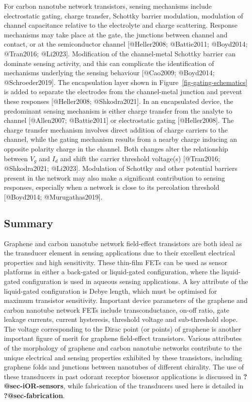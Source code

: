 \documentclass[
  letterpaper,
  DIV=11,
  numbers=noendperiod]{scrartcl}
\begin{document}
For carbon nanotube network transistors, sensing mechanisms include
electrostatic gating, charge transfer, Schottky barrier modulation,
modulation of channel capacitance relative to the electrolyte and charge
scattering. Response mechanisms may take place at the gate, the
junctions between channel and contact, or at the semiconductor channel
{[}@Heller2008; @Battie2011; @Boyd2014; @Tran2016; @Li2023{]}.
Modification of the channel-metal Schottky barrier can dominate sensing
activity, and this can complicate the identification of mechanisms
underlying the sensing behaviour {[}@Cao2009; @Boyd2014;
@Schroeder2019{]}. The encapsulation layer shown in
Figure~\ref{fig-gating-schematics} is added to separate the electrodes
from the channel-metal junction and prevent these responses
{[}@Heller2008; @Shkodra2021{]}. In an encapsulated device, the
predominant sensing mechanism is either charge transfer from the analyte
to channel {[}@Allen2007; @Battie2011{]} or electrostatic gating
{[}@Heller2008{]}. The charge transfer mechanism involves direct
addition of charge carriers to the channel, while the gating mechanism
results from a nearby charge inducing an opposite polarity charge in the
channel. Both changes alter the relationship between \(V_g\) and \(I_d\)
and shift the carrier threshold voltage(s) {[}@Tran2016; @Shkodra2021;
@Li2023{]}. Modulation of Schottky and other potential barriers present
in the network may also make a significant contribution to sensing
responses, especially when a network is close to its percolation
threshold {[}@Boyd2014; @Murugathas2019{]}.

\subsection{Summary}\label{summary}

Graphene and carbon nanotube network field-effect transistors are both
ideal as the transducer element in sensing applications due to their
excellent electrical properties and high sensitivity. These thin-film
FETs can be used as sensor platforms in either a back-gated or
liquid-gated configuration, where the liquid-gated configuration is used
in aqueous sensing applications. A key attribute of the liquid-gated
configuration is Debye length, which must be optimised for maximum
transistor sensitivity. Important device parameters of the graphene and
carbon nanotube network FETs include transconductance, on-off ratio,
gate leakage currents, current hysteresis, threshold voltage and
sub-threshold slope. The voltage corresponding to the Dirac point (or
points) of graphene is another important figure of merit for graphene
field-effect transistors. Various attributes of the morphology of
graphene and carbon nanotube networks contribute to the unique
electrical and sensing properties exhibited by these transistors,
including graphene folds and junctions between nanotubes of different
chirality. The use of these transducers in past odorant receptor
biosensor applications is discussed in \textbf{?@sec-iOR-sensors}, while
fabrication of the transducers used here is detailed in
\textbf{?@sec-fabrication}.
\end{document}
